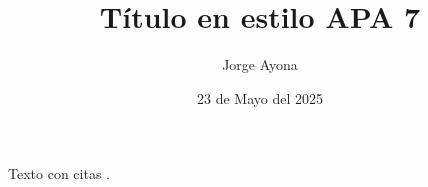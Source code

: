 \documentclass[man]{apa7}
\title{Título en estilo APA 7}
\author{Jorge Ayona}
\affiliation{} %
\date{23 de Mayo del 2025}
\begin{document}
\maketitle

Texto con citas \parencite{autor2024}.

\printbibliography
\end{document}
